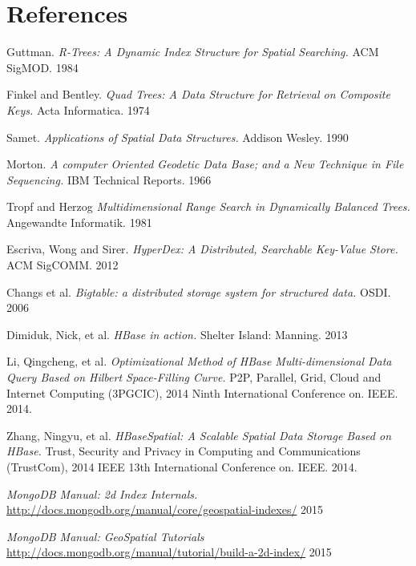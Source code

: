\documentclass[11pt]{article}
\begin{document}
\section{References}

\raggedright

\begin{thebibliography}{99}

  Guttman.
  \emph{R-Trees: A Dynamic Index Structure for Spatial Searching.}
  ACM SigMOD.
  1984

  Finkel and Bentley.
  \emph{Quad Trees: A Data Structure for Retrieval on Composite Keys.}
  Acta Informatica.
  1974

  Samet.
  \emph{Applications of Spatial Data Structures.}
  Addison Wesley.
  1990

  Morton.
  \emph{A computer Oriented Geodetic Data Base; and a New Technique in File Sequencing.}
  IBM Technical Reports. 
  1966

 Tropf and Herzog
 \emph{Multidimensional Range Search in Dynamically Balanced Trees.}
 Angewandte Informatik.
 1981

  Escriva, Wong and Sirer.
  \emph{HyperDex: A Distributed, Searchable Key-Value Store.}
  ACM SigCOMM.
  2012

  Changs et al.
  \emph{Bigtable: a distributed storage system for structured data.}
  OSDI.
  2006

  Dimiduk, Nick, et al.
  \emph{HBase in action.}
   Shelter Island: Manning.
   2013

  Li, Qingcheng, et al.
  \emph{Optimizational Method of HBase Multi-dimensional Data Query Based on Hilbert Space-Filling Curve.}
   P2P, Parallel, Grid, Cloud and Internet Computing (3PGCIC), 2014 Ninth International Conference on. IEEE.
   2014.

  Zhang, Ningyu, et al. 
  \emph{HBaseSpatial: A Scalable Spatial Data Storage Based on HBase.}
   Trust, Security and Privacy in Computing and Communications (TrustCom), 2014 IEEE 13th International Conference on. IEEE.
   2014. 
   
  \emph{MongoDB Manual: 2d Index Internals.}
  \url{http://docs.mongodb.org/manual/core/geospatial-indexes/}
  2015


  \emph{MongoDB Manual: GeoSpatial Tutorials}
  \url{http://docs.mongodb.org/manual/tutorial/build-a-2d-index/}
  2015


\end{thebibliography}
\end{document}
